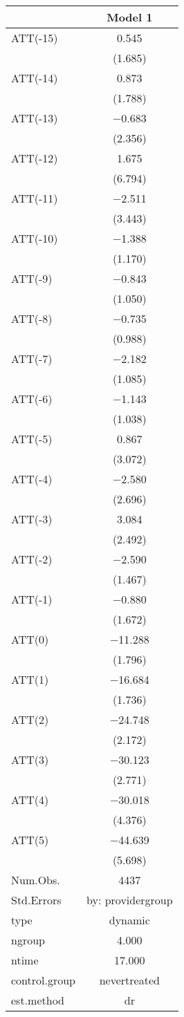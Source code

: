 \begin{table}
\centering
\begin{tabular}[t]{lc}
\toprule
  & Model 1\\
\midrule
ATT(-15) & \num{0.545}\\
 & (\num{1.685})\\
ATT(-14) & \num{0.873}\\
 & (\num{1.788})\\
ATT(-13) & \num{-0.683}\\
 & (\num{2.356})\\
ATT(-12) & \num{1.675}\\
 & (\num{6.794})\\
ATT(-11) & \num{-2.511}\\
 & (\num{3.443})\\
ATT(-10) & \num{-1.388}\\
 & (\num{1.170})\\
ATT(-9) & \num{-0.843}\\
 & (\num{1.050})\\
ATT(-8) & \num{-0.735}\\
 & (\num{0.988})\\
ATT(-7) & \num{-2.182}\\
 & (\num{1.085})\\
ATT(-6) & \num{-1.143}\\
 & (\num{1.038})\\
ATT(-5) & \num{0.867}\\
 & (\num{3.072})\\
ATT(-4) & \num{-2.580}\\
 & (\num{2.696})\\
ATT(-3) & \num{3.084}\\
 & (\num{2.492})\\
ATT(-2) & \num{-2.590}\\
 & (\num{1.467})\\
ATT(-1) & \num{-0.880}\\
 & (\num{1.672})\\
ATT(0) & \num{-11.288}\\
 & (\num{1.796})\\
ATT(1) & \num{-16.684}\\
 & (\num{1.736})\\
ATT(2) & \num{-24.748}\\
 & (\num{2.172})\\
ATT(3) & \num{-30.123}\\
 & (\num{2.771})\\
ATT(4) & \num{-30.018}\\
 & (\num{4.376})\\
ATT(5) & \num{-44.639}\\
 & (\num{5.698})\\
\midrule
Num.Obs. & \num{4437}\\
Std.Errors & by: providergroup\\
type & dynamic\\
ngroup & \num{4.000}\\
ntime & \num{17.000}\\
control.group & nevertreated\\
est.method & dr\\
\bottomrule
\end{tabular}
\end{table}
